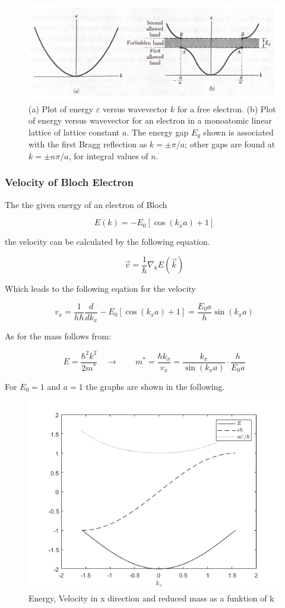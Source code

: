 \begin{figure}[H]
  \centering
  \includegraphics[width=0.6\linewidth]{Graphics/Chapter2/ek_allowed.png}
  \caption{(a) Plot of energy $\varepsilon$ versus wavevector $k$ for a free electron. (b) Plot of energy versus wavevector for an electron in a monoatomic
  linear lattice of lattice constant $a$. The energy gap $E_g$ shown is associated with the first Bragg reflection as $k=\pm \pi/a$; other gaps 
  are found at $k=\pm n\pi/a$, for integral values of $n$.
  \cite[Introduction to  Solid State Physics p. 177]{kittel} }
  \label{fig:temp_resistitviy}
\end{figure}

\subsubsection*{Velocity of Bloch Electron}

The the given energy of an electron of Bloch 

$$E(k) =  -E_0\left[\cos(k_xa)+1\right]$$ 
 
the velocity can be calculated by the following equation.

$$\vec{v} = \frac{1}{\hbar} \nabla_k E(\vec{k})$$

Which leads to the following eqation for the velocity

$$v_x = \frac{1}{h\hbar} \frac{d}{dk_x} -E_0\left[\cos(k_xa)+1\right] = \frac{E_0a}{h} \sin(k_xa)$$

As for the mass follows from:

$$E = \frac{\hbar^2k^2}{2m^*} \quad \rightarrow \qquad m^* = \frac{\hbar k_x}{v_x}  = \frac{k_x}{\sin(k_xa)} \cdot \frac{h}{E_0a}$$

For $E_0 = 1$ and $a=1$ the graphs are shown in the following.

\begin{figure}[H]
    \centering
    \includegraphics[width=0.5\linewidth]{Graphics/Chapter2/E_of_K.png}
    \caption{Energy, Velocity in x direction and reduced mass as a funktion of k}
    \label{fig:PNjunction}
  \end{figure}

